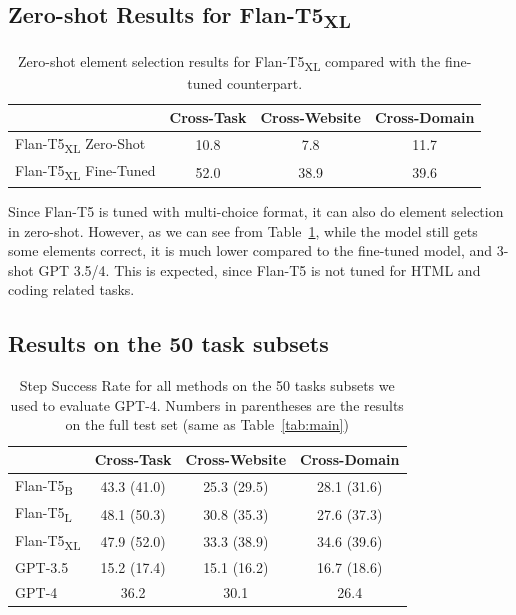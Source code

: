 \subsection{Zero-shot Results for Flan-T5\textsubscript{XL}}
\label{app:flan-t5_zero}
\begin{table}[]
    \centering
    \caption{Zero-shot element selection results for Flan-T5\textsubscript{XL} compared with the fine-tuned counterpart.}
    \begin{tabular}{lccc}
         \toprule
         & \textbf{Cross-Task}& \textbf{Cross-Website} & \textbf{Cross-Domain} \\
         \midrule
         Flan-T5\textsubscript{XL} Zero-Shot& \num{10.8} &	\num{7.8} & \num{11.7} \\
         Flan-T5\textsubscript{XL} Fine-Tuned& \num{52.0} &\num{38.9}&\num{39.6}\\
         \bottomrule
    \end{tabular}
    \label{tab:flan-t5_zero}
\end{table}
Since Flan-T5 is tuned with multi-choice format, it can also do element selection in zero-shot. However, as we can see from Table~\ref{tab:flan-t5_zero}, while the model still gets some elements correct, it is much lower compared to the fine-tuned model, and \num{3}-shot GPT 3.5/4. This is expected, since Flan-T5 is not tuned for HTML and coding related tasks.
\subsection{Results on the \num{50} task subsets}
\label{app:result_50}
\begin{table}[]
    \centering
        \caption{Step Success Rate for all methods on the \num{50} tasks subsets we used to evaluate GPT-4. Numbers in parentheses are the results on the full test set (same as Table~\ref{tab:main})}
    \begin{tabular}{lccc}
         \toprule
         & \textbf{Cross-Task}& \textbf{Cross-Website} & \textbf{Cross-Domain} \\
         \midrule
Flan-T5\textsubscript{B}&	\num{43.3} (\num{41.0})&	\num{25.3} (\num{29.5})&	\num{28.1} (\num{31.6})\\
Flan-T5\textsubscript{L}&	\num{48.1} (\num{50.3})&	\num{30.8} (\num{35.3})&	\num{27.6} (\num{37.3})\\
Flan-T5\textsubscript{XL}&	\num{47.9} (\num{52.0})&	\num{33.3} (\num{38.9})&	\num{34.6} (\num{39.6})\\
GPT-3.5&	\num{15.2} (\num{17.4})&	\num{15.1} (\num{16.2})&	\num{16.7} (\num{18.6})\\
GPT-4&	\num{36.2}&	\num{30.1}&	\num{26.4}\\
\bottomrule
    \end{tabular}
    \label{tab:result_50}
\end{table}


